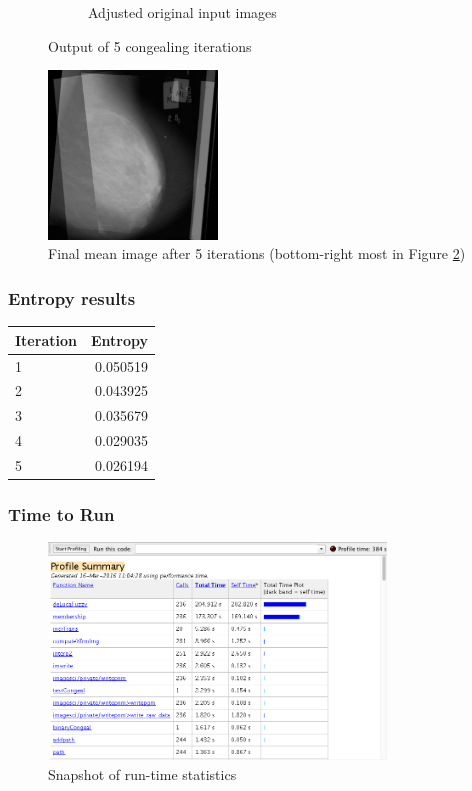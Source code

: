 \begin{figure}[!ht]
\begin{subfigure}[b]{0.4\textwidth}
        \caption{Adjusted original input images}
        \label{fig:adj-ser}
    \end{subfigure}
    \caption{Output of 5 congealing iterations}\label{fig:mammo-results}
\end{figure}

\begin{figure}[!ht]
  \centering
  \includegraphics[width=0.4\textwidth]{Chapter2/non-prob-img/final_mean.jpg}
  \caption{Final mean image after 5 iterations (bottom-right most in Figure \ref{fig:mammo-results})}
  \label{fig:final-mean}
\end{figure}

\subsubsection{Entropy results}

  \begin{tabular}{ | l | r | }
    \hline
    \textbf{Iteration} & \textbf{Entropy} \\
    \hline
    1 & 0.050519 \\ \hline
    2 & 0.043925 \\ \hline
    3 & 0.035679 \\ \hline
    4 & 0.029035 \\ \hline
    5 & 0.026194 \\ \hline
  \end{tabular}

\subsubsection{Time to Run}

\begin{figure}[!ht]
  \centering
  \includegraphics[width=0.8\textwidth]{Chapter2/non-prob-img/Run-time.png}
  \caption{Snapshot of run-time statistics}
  \label{fig:run-time}
\end{figure}
